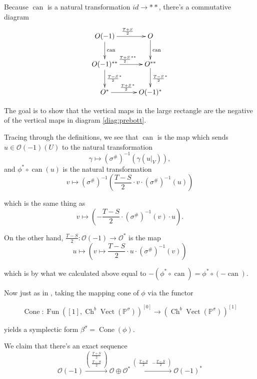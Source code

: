 \documentclass[edeposit,fullpage]{uiucthesis2009}
\newcommand{\mbb}{\mathbb}
\newcommand{\mc}{\mathcal}
\DeclareMathOperator{\can}{can}
\DeclareMathOperator{\Ch}{Ch}
\DeclareMathOperator{\Fun}{Fun}
\DeclareMathOperator{\Vect}{Vect}
\DeclareMathOperator{\Cone}{Cone}
\theoremstyle{plain}
\numberwithin{lemma}{section}
\theoremstyle{definition}
\begin{document}
Because $\can$ is a natural transformation $id \rightarrow \ast\ast$,
there's a commutative diagram
\[
\xymatrix{O(-1) \ar[d]^{\can} \ar[r]^{\frac{T+S}{2}} & O \ar[d]^{\can}
  \\ O(-1)^{\ast\ast} \ar[r]^{\frac{T+S}{2}^{\ast\ast}}
  \ar[d]^{\frac{T-S}{2}^\ast} & \ar[d]^{\frac{T-S}{2}^\ast}  O^{\ast\ast}
\\O^{\ast} \ar[r]^{\frac{T+S}{2}^{\ast}} & O(-1)^{\ast}
}
\]

The goal is to show that the vertical maps in the large rectangle are
the negative of the vertical maps in diagram \ref{diag:prebott}.

Tracing
through the definitions, we see that $\can$ is the map which sends $u
\in \mc O(-1)(U)$ to the natural transformation
\[
\gamma \mapsto (\sigma^\#)^{-1}(\gamma(u|_V)),
\]
and $\phi^* \circ \can (u)$ is the natural transformation
\[
v \mapsto (\sigma^\#)^{-1}\left(\frac{T-S}{2} \cdot v \cdot (\sigma^\#)^{-1}(u)\right)
\]

which is the same thing as
\[
v \mapsto \left(-\frac{T-S}{2} \cdot (\sigma^\#)^{-1} (v) \cdot u\right).
\]


On the other hand, $\frac{T-S}{2} :
\mc O(-1) \rightarrow \mc O^*$ is the map
\[
u \mapsto (v \mapsto \frac{T-S}{2} \cdot u \cdot (\sigma^\#)^{-1}(v))
\]

which is by what we calculated above equal to $-(\phi^* \circ \can) =
\phi^* \circ (-\can)$.

Now just as in \cite{Schder}, taking the mapping cone of $\phi$ via
the functor

\[
\Cone : \Fun([1],\Ch^b\Vect(\mbb P^\sigma))^{[0]} \rightarrow
\left(\Ch^b\Vect(\mathbb P^\sigma)\right)^{[1]}
\]

yields a symplectic form $\beta^\sigma = \Cone(\phi)$. 

We claim that there's an exact sequence
\[
\mc O(-1) \xrightarrow{\begin{pmatrix}\frac{T+S}{2} \\ \frac{T-S}{2} \end{pmatrix}} \mc O \oplus \mc O^* \xrightarrow{\begin{pmatrix}\frac{T+S}{2} & -\frac{T-S}{2} \end{pmatrix}} \mc O(-1)^*
\]
\end{document}
